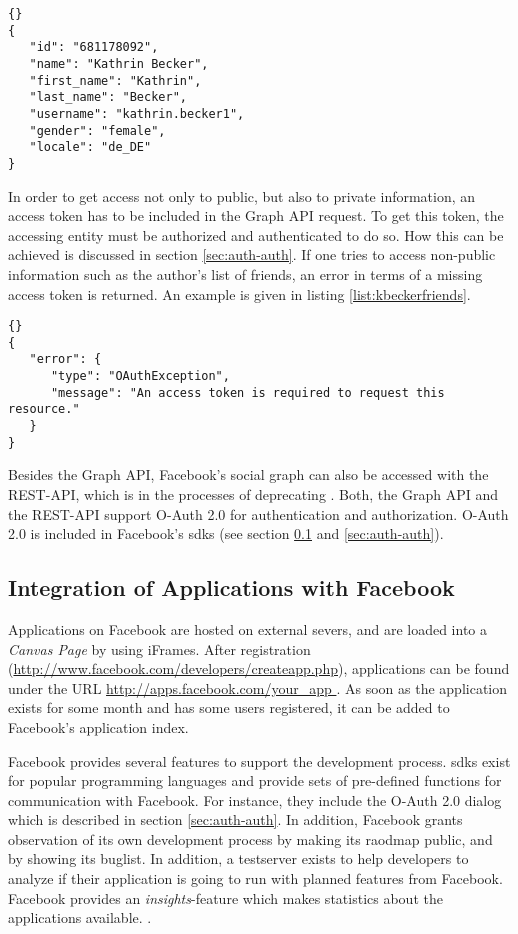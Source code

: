 \documentclass[preprint,12pt]{elsarticle}
\begin{document}
\begin{lstlisting}[caption=JSON object from
  \url{https://graph.facebook.com/681178092},
  label=list:kbecker]{}
{
   "id": "681178092",
   "name": "Kathrin Becker",
   "first_name": "Kathrin",
   "last_name": "Becker",
   "username": "kathrin.becker1",
   "gender": "female",
   "locale": "de_DE"
}
\end{lstlisting}

In order to get access not only to public, but also to private
information, an access token has to be included in the Graph API
request. To get this token, the accessing entity must be
authorized and authenticated to do so. How this can be achieved is
discussed in section \ref{sec:auth-auth}. If one tries to access
non-public information such as the author's list of friends, an error
in terms of a missing access token is returned. An example is given in
listing \ref{list:kbeckerfriends}.


\begin{lstlisting}[caption=JSON object from
  \url{https://graph.facebook.com/681178092/friends},
  label=list:kbeckerfriends]{}
{
   "error": {
      "type": "OAuthException",
      "message": "An access token is required to request this resource."
   }
}
\end{lstlisting}


Besides the Graph API, Facebook's social graph can also be accessed
with the REST-API, which is in the processes of deprecating
\cite{facebookDev3}. Both, the Graph API and the REST-API support
O-Auth 2.0 for authentication and authorization. O-Auth 2.0 is
included in Facebook's \ac{sdks} (see section
\ref{sec:integr-appl-with} and \ref{sec:auth-auth}).




\subsection{Integration of Applications with Facebook}
\label{sec:integr-appl-with}
Applications on Facebook are hosted on external severs, and are loaded
into a \textit{Canvas Page} by using iFrames. After registration
(\url{http://www.facebook.com/developers/createapp.php}), applications
can be found under the URL \url{http://apps.facebook.com/your_app }.
As soon as the application exists for some month and has
some users registered, it can be added to Facebook's application
index. 

Facebook provides several features to support the development
process. \ac{sdks} exist for popular programming languages and provide
sets of pre-defined functions for communication with Facebook. For
instance, they include the O-Auth 2.0 dialog which is described in
section \ref{sec:auth-auth}. In
addition, Facebook grants observation of its own development process by
making its raodmap public, and by showing its buglist. In addition, a
testserver exists to help developers to analyze if their application
is going to run with planned features from Facebook. 
Facebook provides an \textit{insights}-feature which makes
statistics about the applications available. \cite{oreilly}.
\end{document}
